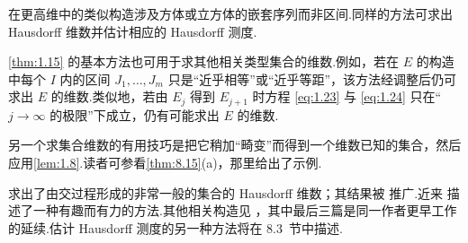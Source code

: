 在更高维中的类似构造涉及方体或立方体的嵌套序列而非区间.同样的方法可求出 Hausdorff 维数并估计相应的 Hausdorff 测度.

\cref{thm:1.15} 的基本方法也可用于求其他相关类型集合的维数.例如，若在 $E$ 的构造中每个 $I$ 内的区间 $J_1,\ldots,J_m$ 只是``近乎相等''或``近乎等距''，该方法经调整后仍可求出 $E$ 的维数.类似地，若由 $E_j$ 得到 $E_{j+1}$ 时方程 \eqref{eq:1.23} 与 \eqref{eq:1.24} 只在``$j\to\infty$ 的极限''下成立，仍有可能求出 $E$ 的维数.

另一个求集合维数的有用技巧是把它稍加``畸变''而得到一个维数已知的集合，然后应用\cref{lem:1.8}.读者可参看\cref{thm:8.15}(a)，那里给出了示例.

\textcite{eggleston1952} 求出了由交过程形成的非常一般的集合的 Hausdorff 维数；其结果被 \textcite{peyriere1977} 推广.近来 \textcite{daviesfast1978} 描述了一种有趣而有力的方法.其他相关构造见 \textcites{randolph1941,erdos1946,ravetz1954,besicovitchtaylor1954,beardon1965,best1942,ciglervolkmann1963,wegmann1971b}，其中最后三篇是同一作者更早工作的延续.估计 Hausdorff 测度的另一种方法将在 8.3~节中描述.

